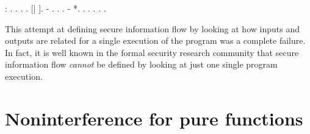 \documentclass[12pt]{report}
\begin{document}
\begin{coqdoccode}
\coqdocemptyline
\coqdocnoindent
{}  :  .\coqdoceol
\coqdocnoindent
{}.\coqdoceol
\coqdocindent{1.00em}
 .   .    [|  ].\coqdoceol
\coqdocindent{1.00em}
- .  .  .\coqdoceol
\coqdocindent{1.00em}
-   *.  .    .  .  .\coqdoceol
\coqdocnoindent
{}.\coqdoceol
\coqdocemptyline
\end{coqdoccode}
This attempt at defining secure information flow by looking at how
    inputs and outputs are related for a single execution of the
    program was a complete failure. In fact, it is well known in the
    formal security research community that secure information flow
    \textit{cannot} be defined by looking at just one single program execution. 
\begin{coqdoccode}
\coqdocemptyline
\end{coqdoccode}
\section{Noninterference for pure functions}
\end{document}
